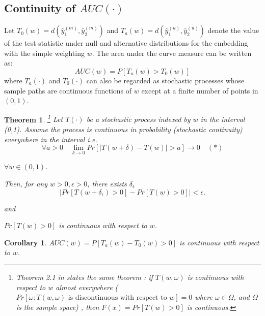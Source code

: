 \documentclass[11pt]{article} %
\newtheorem{thm}{Theorem}
\newtheorem{cor}{Corollary}
\begin{document}
 
\subsection{Continuity of $AUC(\cdot)$} 
 Let $T_0(w)=d(\hat{y}_{1}^{{(m)}},\hat{y}_{2}^{{(m)}})$ and $T_a(w)=d(\hat{y}_{1}^{(u)},\hat{y}_{2}^{(u)})$ denote the value of the test statistic under null and alternative distributions  for the embedding with the simple weighting $w$.  %
The area under the curve measure can be written as: $$AUC(w)=P\left[T_a(w)>T_0(w)\right]$$ where $T_a(\cdot)$ and $T_0(\cdot)$ can also be regarded as  stochastic processes whose sample paths are continuous functions of $w$ except at a finite number of points in $(0,1)$.


\begin{thm}\footnote{
Theorem 2.1 in \cite{Norkin1993} states the same theorem :  if $T(w,\omega)$ is continuous with respect to $w$  almost everywhere 
($Pr[\omega:T(w,\omega)\textrm{ is discontinuous with respect to } w]=0$  where $\omega \in \Omega$, and $\Omega$ is the sample space)
, then $F(x)=Pr\left[T(w)>0\right]$ is continuous.}
Let $T(\cdot)$ be  a stochastic process indexed by $w$ in the interval (0,1). Assume  the process is continuous in probability  (stochastic continuity)   everywhere in the interval  i.e.
$$ \forall a>0 \quad  \lim_{\delta \rightarrow 0} Pr\left[\left|T(w+\delta)-T(w) \right|>a \right] \rightarrow 0 \quad(*)$$ 

 $\forall w\in (0,1)$.

Then, for any $w>0, \epsilon>0$, there exists $\delta_{\epsilon}$ $$\left| Pr\left[T(w+\delta_{\epsilon})>0 \right]- Pr\left[T(w)>0 \right]\right|<\epsilon .  $$

and 

$Pr \left[ T(w)>0\right]$ is continuous with respect to $w$.
\end{thm}

\begin{cor}{
 $AUC(w)=P\left[T_a(w)-T_0(w) >0 \right]$ is continuous with respect to $w$.}
\end{cor}
\end{document}
